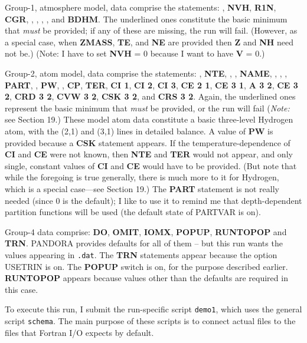 Group-1, atmosphere model, data comprise the statements: ,
{\bf NVH}, {\bf R1N}, {\bf CGR}, , , ,
, and {\bf BDHM}. The underlined ones constitute the basic
minimum that {\it must} be provided; if any of these are missing, the
run will fail. (However, as a special case, when {\bf ZMASS}, {\bf TE}, and
{\bf NE} are provided then {\bf Z} and {\bf NH} need not be.)
(Note: I have to set {\bf NVH} = 0 because I want to have {\bf V} = 0.)

Group-2, atom model, data comprise the statements: ,
{\bf NTE}, , \break {}, {\bf NAME},
, , , {\bf PART},
, {\bf PW}, \break 
{}, {\bf CP}, {\bf TER}, {\bf CI 1}, {\bf CI 2}, {\bf CI 3},
{\bf CE 2 1}, {\bf CE 3 1}, {\bf A 3 2}, 
{\bf CE 3 2}, {\bf CRD 3 2},
{\bf CVW 3 2}, {\bf CSK 3 2}, and {\bf CRS 3 2}. Again, the underlined ones
represent the basic minimum that {\it must} be provided, or the run will fail
({\it Note:} see Section 19.)
These model atom data constitute a basic three-level Hydrogen atom,
with the (2,1) and (3,1) lines in detailed balance.
A value of {\bf PW} is provided because a {\bf CSK} statement
appears. If the temperature-dependence of {\bf CI} and {\bf CE} were not
known, then {\bf NTE} and {\bf TER} would not appear, and only single,
constant values of {\bf CI} and {\bf CE} would have to be provided.
(But note that while the foregoing is true generally, there is much more
to it for Hydrogen, which is a special case---see Section 19.)
The {\bf PART} statement is not really needed (since 0 is the default);
I like to use it to remind me that depth-dependent partition functions
will be used (the default state of PARTVAR is on).

Group-4 data comprise: {\bf DO}, {\bf OMIT}, {\bf IOMX}, {\bf POPUP}, {\bf RUNTOPOP}
and {\bf TRN}. PANDORA provides defaults for all of them -- but this run wants
the values appearing in {\tt .dat}. The {\bf TRN} statements appear because
the option USETRIN is on. The {\bf POPUP} switch is on, for the
purpose described earlier. {\bf RUNTOPOP} appears because values other than the
defaults are required in this case.

To execute this run, I submit the run-specific script {\tt demo1}, which uses
the general script {\tt schema}. The main purpose of these scripts is to
connect actual files to the files that Fortran I/O expects by default.

